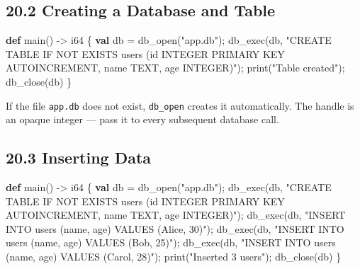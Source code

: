 \documentclass[
  english,
]{book}
\newenvironment{Shaded}{\begin{snugshade}}{\end{snugshade}}
\newcommand{\DataTypeTok}[1]{\textcolor[rgb]{0.31,0.79,0.69}{#1}}
\newcommand{\FunctionTok}[1]{\textcolor[rgb]{0.86,0.86,0.67}{#1}}
\newcommand{\KeywordTok}[1]{\textcolor[rgb]{0.34,0.61,0.84}{\textbf{#1}}}
\newcommand{\NormalTok}[1]{\textcolor[rgb]{0.83,0.83,0.83}{#1}}
\newcommand{\OperatorTok}[1]{\textcolor[rgb]{0.83,0.83,0.83}{#1}}
\newcommand{\StringTok}[1]{\textcolor[rgb]{0.81,0.57,0.47}{#1}}
\begin{document}
\subsection{20.2 Creating a Database and
Table}\label{creating-a-database-and-table}

\begin{Shaded}
\begin{Highlighting}[]
\KeywordTok{def}\NormalTok{ main() }\OperatorTok{{-}\textgreater{}} \DataTypeTok{i64}\NormalTok{ \{}
    \KeywordTok{val}\NormalTok{ db }\OperatorTok{=}\NormalTok{ db\_open(}\StringTok{"app.db"}\NormalTok{);}
\NormalTok{    db\_exec(db, }\StringTok{"CREATE TABLE IF NOT EXISTS users (id INTEGER PRIMARY KEY AUTOINCREMENT, name TEXT, age INTEGER)"}\NormalTok{);}
    \FunctionTok{print}\NormalTok{(}\StringTok{"Table created"}\NormalTok{);}
\NormalTok{    db\_close(db)}
\NormalTok{\}}
\end{Highlighting}
\end{Shaded}

If the file \texttt{app.db} does not exist, \texttt{db\_open} creates it
automatically. The handle is an opaque integer --- pass it to every
subsequent database call.

\subsection{20.3 Inserting Data}\label{inserting-data}

\begin{Shaded}
\begin{Highlighting}[]
\KeywordTok{def}\NormalTok{ main() }\OperatorTok{{-}\textgreater{}} \DataTypeTok{i64}\NormalTok{ \{}
    \KeywordTok{val}\NormalTok{ db }\OperatorTok{=}\NormalTok{ db\_open(}\StringTok{"app.db"}\NormalTok{);}
\NormalTok{    db\_exec(db, }\StringTok{"CREATE TABLE IF NOT EXISTS users (id INTEGER PRIMARY KEY AUTOINCREMENT, name TEXT, age INTEGER)"}\NormalTok{);}
\NormalTok{    db\_exec(db, }\StringTok{"INSERT INTO users (name, age) VALUES (\textquotesingle{}Alice\textquotesingle{}, 30)"}\NormalTok{);}
\NormalTok{    db\_exec(db, }\StringTok{"INSERT INTO users (name, age) VALUES (\textquotesingle{}Bob\textquotesingle{}, 25)"}\NormalTok{);}
\NormalTok{    db\_exec(db, }\StringTok{"INSERT INTO users (name, age) VALUES (\textquotesingle{}Carol\textquotesingle{}, 28)"}\NormalTok{);}
    \FunctionTok{print}\NormalTok{(}\StringTok{"Inserted 3 users"}\NormalTok{);}
\NormalTok{    db\_close(db)}
\NormalTok{\}}
\end{Highlighting}
\end{Shaded}
\end{document}
